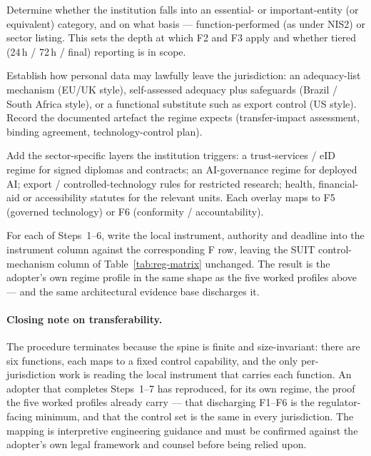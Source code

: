 \begin{description}[leftmargin=2.2em,style=nextline]
    Determine whether the institution falls into an essential- or
    important-entity (or equivalent) category, and on what basis ---
    function-performed (as under NIS2) or sector listing. This sets the
    depth at which F2 and F3 apply and whether tiered (24\,h / 72\,h /
    final) reporting is in scope.
  \item[Step 5 --- Identify your transfer regime (F4).]
    Establish how personal data may lawfully leave the jurisdiction:
    an adequacy-list mechanism (EU/UK style), self-assessed adequacy
    plus safeguards (Brazil / South Africa style), or a functional
    substitute such as export control (US style). Record the documented
    artefact the regime expects (transfer-impact assessment, binding
    agreement, technology-control plan).
  \item[Step 6 --- Identify your sector overlays (F5/F6).]
    Add the sector-specific layers the institution triggers: a
    trust-services / eID regime for signed diplomas and contracts; an
    AI-governance regime for deployed AI; export / controlled-technology
    rules for restricted research; health, financial-aid or
    accessibility statutes for the relevant units. Each overlay maps to
    F5 (governed technology) or F6 (conformity / accountability).
  \item[Step 7 --- Bind each finding to the control set.]
    For each of Steps~1--6, write the local instrument, authority and
    deadline into the instrument column against the corresponding F
    row, leaving the SUIT control-mechanism column of
    Table~\ref{tab:reg-matrix} unchanged. The result is the adopter's
    own regime profile in the same shape as the five worked profiles
    above --- and the same architectural evidence base discharges it.
\end{description}

\paragraph{Closing note on transferability.} The procedure terminates
because the spine is finite and size-invariant: there are six functions,
each maps to a fixed control capability, and the only per-jurisdiction
work is reading the local instrument that carries each function. An
adopter that completes Steps~1--7 has reproduced, for its own regime,
the proof the five worked profiles already carry --- that discharging
F1--F6 is the regulator-facing minimum, and that the
 control set is the same in every jurisdiction. The
mapping is interpretive engineering guidance and must be confirmed
against the adopter's own legal framework and counsel before being
relied upon.

\endinput
